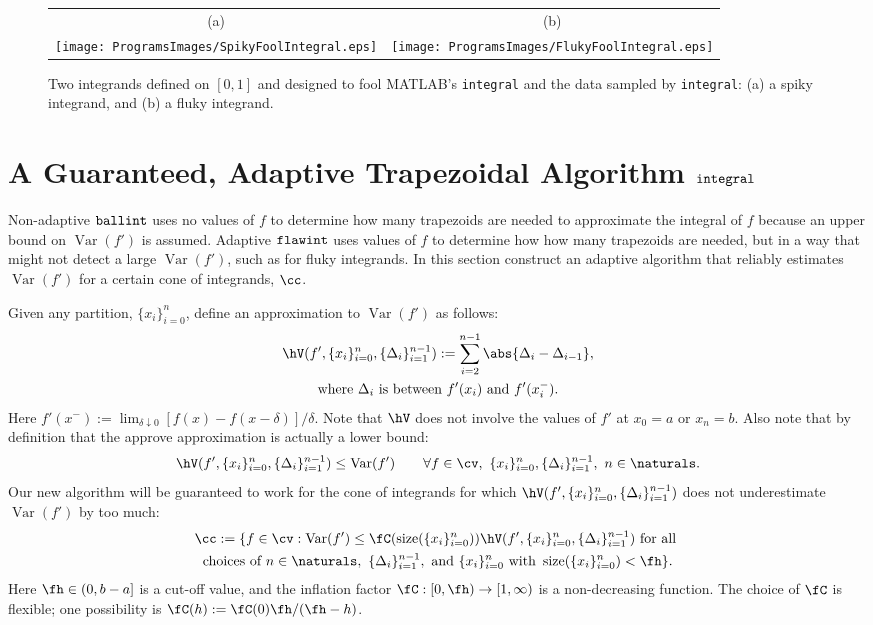 \documentclass[]{article}
\DeclareMathOperator{\integ}{\texttt{\textup{integral}}}
\DeclareMathOperator{\flawinteg}{\texttt{\textup{flawint}}}
\DeclareMathOperator{\ballinteg}{\texttt{\textup{ballint}}}
\DeclareMathOperator{\Var}{Var}
\DeclareMathOperator{\size}{size}
\theoremstyle{definition}
\theoremstyle{remark}
\newcommand{\datasites}{\{x_i\}_{i=0}^n}
\newcommand{\hcut}{\fh}
\newcommand{\Matlab}{MATLAB\xspace}
\begin{document}
\begin{figure}
\centering 
\begin{tabular}{cc}
(a) & (b) \\
\texttt{[image: ProgramsImages/SpikyFoolIntegral.eps]}
&
\texttt{[image: ProgramsImages/FlukyFoolIntegral.eps]}
\end{tabular}
\caption{Two integrands defined on $[0,1]$ and designed to fool \Matlab's {\tt integral} and the data sampled by {\tt integral}:  (a) a spiky integrand, and  (b) a fluky integrand. \label{fig:foolquad}}
\end{figure}

\section{A Guaranteed, Adaptive Trapezoidal Algorithm $\integ$} \label{newalgosec}

Non-adaptive $\ballinteg$ uses no values of $f$ to determine how many trapezoids are needed to approximate the integral of $f$ because an upper bound on $\Var(f')$ is assumed.  Adaptive $\flawinteg$ uses values of $f$ to determine how how many trapezoids are needed, but in a way that might not detect a large $\Var(f')$, such as for fluky integrands.  In this section construct an adaptive algorithm that reliably estimates $\Var(f')$ for a certain cone of integrands, $\cc$.

Given any partition, $\datasites$, define an approximation to $\Var(f')$ as follows:
\begin{multline} \label{tVdef}
\hV(f',\datasites,\{\Delta_{i}\}_{i=1}^{n-1}) : = \sum_{i=2}^{n-1} \abs{\Delta_{i} - \Delta_{i-1}}, \\
\text{where } \Delta_{i} \text{ is between } f'(x_i) \text{ and } f'(x_i^-).
\end{multline}
Here $f'(x^-):= \lim_{\delta \downarrow 0} [f(x) - f(x-\delta)]/\delta$.  Note that $\hV$ does not involve the values of $f'$ at $x_0=a$ or $x_n=b$.  Also note that by definition that the approve approximation is actually a lower bound:
\begin{equation} \label{hVlowerbd}
\hV(f',\datasites,\{\Delta_{i}\}_{i=1}^{n-1}) \le \Var(f') \qquad \forall f \in \cv, \ \datasites, \{\Delta_{i}\}_{i=1}^{n-1}, \ n \in \naturals.
\end{equation}
Our new algorithm will be guaranteed to work for the cone of integrands for which $\hV(f',\datasites,\{\Delta_{i}\}_{i=1}^{n-1})$ does not underestimate $\Var(f')$ by too much:
\begin{multline} \label{conedef}
\cc := \{ f \in \cv : \Var(f') \le \fC(\size(\datasites)) \hV(f',\datasites,\{\Delta_{i}\}_{i=1}^{n-1}) \text{ for all } \\
\text{choices of }  n \in \naturals, \ \{\Delta_{i}\}_{i=1}^{n-1}, \text{ and }\datasites \text{ with } \size(\datasites) < \hcut \}.
\end{multline}
Here $\hcut \in (0, b-a]$ is a cut-off value, and the inflation factor $\fC:[0,\hcut) \to [1,\infty)$ is a non-decreasing function.  The choice of $\fC$ is flexible; one possibility is $\fC(h):=\fC(0) \hcut/(\hcut-h)$.
\end{document}
